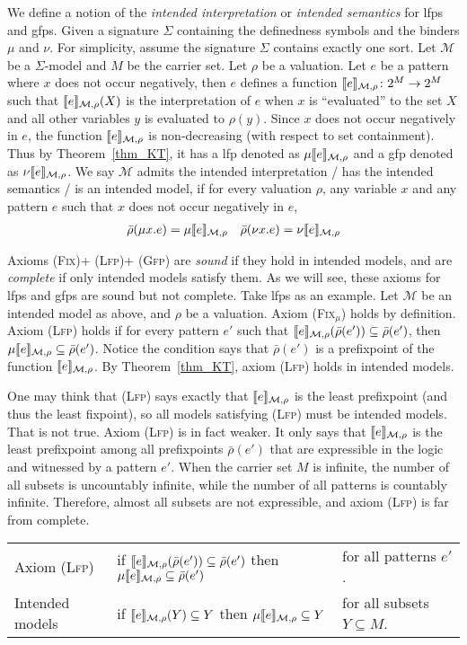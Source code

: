 \documentclass[letter,12pt]{article}
\newcommand{\sig}{{\Sigma}}
\newcommand{\MM}{\mathcal{M}}
\newcommand{\pset}[1]{2^{#1}}
\newcommand{\barrho}{\bar{\rho}}
\newcommand{\prule}[1]{\textsc{(#1)}}
\newcommand{\Lfp}{\prule{Lfp}\xspace}
\newcommand{\Gfp}{\prule{Gfp}\xspace}
\newcommand{\Fix}{\prule{Fix}\xspace}
\newcommand{\Fixmu}{\prule{Fix$_\mu$}\xspace}
\DeclarePairedDelimiter{\bracket}{\llbracket}{\rrbracket}
\begin{document}
We define a notion of the \emph{intended interpretation}
or \emph{intended semantics} for lfps and gfps.
Given a signature $\sig$ containing the definedness symbols and the binders $\mu$ and $\nu$.
For simplicity, assume the signature $\sig$ contains exactly one sort.
Let $\MM$ be a $\sig$-model and $M$ be the carrier set.
Let $\rho$ be a valuation.
Let $e$ be a pattern where $x$ does not occur negatively,
then $e$ defines a function $\bracket{e}_{\MM,\rho} \colon \pset{M} \to \pset{M}$
such that $\bracket{e}_{\MM,\rho}(X)$ is the interpretation of $e$
when $x$ is ``evaluated'' to the set $X$ and all other variables $y$
is evaluated to $\rho(y)$.
Since $x$ does not occur negatively in $e$,
the function $\bracket{e}_{\MM,\rho}$ is non-decreasing (with respect to set containment).
Thus by Theorem~\ref{thm_KT},
it has a lfp denoted as $\mu \bracket{e}_{\MM,\rho}$
and a gfp denoted as $\nu \bracket{e}_{\MM,\rho}$.
We say $\MM$
admits the intended interpretation /
has the intended semantics /
is an intended model,
if for every valuation $\rho$, any variable $x$ and any pattern $e$
such that $x$ does not occur negatively in $e$,
\begin{align*}
\barrho(\mu x . e) = \mu \bracket{e}_{\MM,\rho}
&&
\barrho(\nu x . e) = \nu \bracket{e}_{\MM,\rho}
\end{align*}

Axioms \Fix + \Lfp + \Gfp are \emph{sound} if they hold in intended models,
and are \emph{complete} if only intended models satisfy them.
As we will see, these axioms for lfps and gfps are sound but not complete.
Take lfps as an example.
Let $\MM$ be an intended model as above, and $\rho$ be a valuation.
Axiom \Fixmu holds by definition.
Axiom \Lfp holds if for every pattern $e'$ such that
$\bracket{e}_{\MM,\rho}(\barrho(e')) \subseteq \barrho(e')$,
then
$\mu \bracket{e}_{\MM,\rho} \subseteq \barrho(e')$.
Notice the condition says that $\barrho(e')$ is a prefixpoint of the function
$\bracket{e}_{\MM,\rho}$.
By Theorem~\ref{thm_KT}, axiom \Lfp holds in intended models.

One may think that \Lfp says exactly that $\bracket{e}_{\MM,\rho}$
is the least prefixpoint (and thus the least fixpoint),
so all models satisfying \Lfp must be intended models.
That is not true.
Axiom \Lfp is in fact weaker.
It only says that $\bracket{e}_{\MM,\rho}$ is the least prefixpoint
among all prefixpoints $\barrho(e')$ that are
expressible in the logic and witnessed by a pattern $e'$.
When the carrier set $M$ is infinite, the number of all subsets is uncountably infinite,
while the number of all patterns is countably infinite.
Therefore, almost all subsets are not expressible, and axiom \Lfp
is far from complete.
\begin{center}
\begin{tabular}{lll}
Axiom \Lfp
&
if $\bracket{e}_{\MM,\rho}(\barrho(e')) \subseteq \barrho(e')$
then $\mu \bracket{e}_{\MM,\rho}\subseteq \barrho(e')$
&
for all patterns $e'$.
\\
Intended models
&
if $\bracket{e}_{\MM,\rho}(Y) \subseteq Y$
then $\mu \bracket{e}_{\MM,\rho}\subseteq Y$
&
for all subsets $Y \subseteq M$.
\end{tabular}
\end{center}
\end{document}
